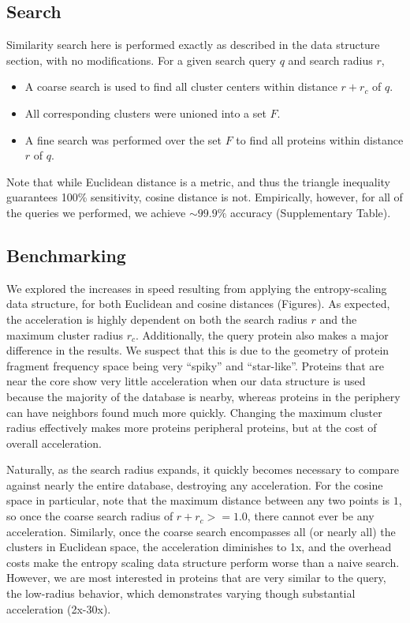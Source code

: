 \documentclass{amsbook}
\theoremstyle{definition}
\theoremstyle{remark}
\numberwithin{equation}{section}
\begin{document}
\subsection*{Search}
Similarity search here is performed exactly as described in the data structure section, with no modifications.
For a given search query $q$ and search radius $r$,
\begin{itemize}
    \item A coarse search is used to find all cluster centers within distance $r+r_c$ of $q$.
    \item All corresponding clusters were unioned into a set $F$.
    \item A fine search was performed over the set $F$ to find all proteins within distance $r$ of $q$.
\end{itemize}

Note that while Euclidean distance is a metric, and thus the triangle inequality guarantees 100\% sensitivity, cosine distance is not.
Empirically, however, for all of the queries we performed, we achieve $\sim 99.9\%$ accuracy (Supplementary Table).

\subsection*{Benchmarking}
We explored the increases in speed resulting from applying the entropy-scaling data structure, for both Euclidean and cosine distances (Figures).
As expected, the acceleration is highly dependent on both the search radius $r$ and the maximum cluster radius $r_c$.
Additionally, the query protein also makes a major difference in the results.
We suspect that this is due to the geometry of protein fragment frequency space being very ``spiky'' and ``star-like''.
Proteins that are near the core show very little acceleration when our data structure is used because the majority of the database is nearby, whereas proteins in the periphery can have neighbors found much more quickly.
Changing the maximum cluster radius effectively makes more proteins peripheral proteins, but at the cost of overall acceleration.

Naturally, as the search radius expands, it quickly becomes necessary to compare against nearly the entire database, destroying any acceleration.
For the cosine space in particular, note that the maximum distance between any two points is $1$, so once the coarse search radius of $r+r_c >= 1.0$, there cannot ever be any acceleration.
Similarly, once the coarse search encompasses all (or nearly all) the clusters in Euclidean space, the acceleration diminishes to 1x, and the overhead costs make the entropy scaling data structure perform worse than a naive search.
However, we are most interested in proteins that are very similar to the query, the low-radius behavior, which demonstrates varying though substantial acceleration (2x-30x).
\end{document}
